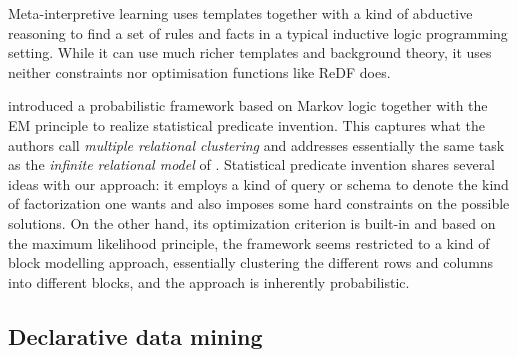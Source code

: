 Meta-interpretive learning \parencite{meta_learning} uses templates together with a kind of abductive reasoning
to find a set of rules and facts in a typical inductive logic programming setting. While it can use much richer templates and 
background theory, it uses neither constraints nor optimisation functions like ReDF does.

\cite{predicateinvention} introduced a probabilistic framework based on Markov logic together with the EM principle to realize statistical predicate invention. This captures what the authors call \textit{multiple relational clustering} and addresses essentially the same task as the \textit{infinite relational model} of \cite{conf/aaai/KempTGYU06}.  Statistical predicate invention shares several ideas with our approach:  it employs a kind of query or schema to denote the kind of factorization one wants and also imposes some hard constraints on the possible solutions. On the other hand, its optimization criterion is built-in and based on the maximum likelihood principle, the framework seems restricted to a kind of block modelling approach, essentially clustering the different rows and columns into different blocks, and the approach is inherently probabilistic.  %


\subsection{Declarative data mining} 




